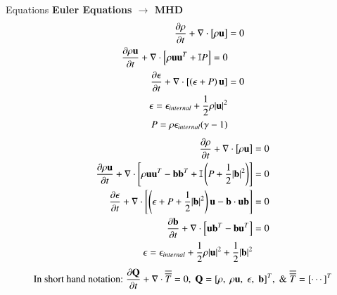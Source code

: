 \begin{frame}[t]{Equations}
  \minipage{\textwidth}
    \textbf{Euler Equations $\rightarrow$ MHD}
      \begin{align*}
        \frac{\partial \rho}{\partial t} + \nabla \cdot \left[\rho \mathbf{u}\right] &= 0 \\
        \frac{\partial \rho \mathbf{u}}{\partial t} + \nabla \cdot \left[\rho \mathbf{u}\mathbf{u}^T + \mathbb{I}P\right] = 0 \\
        \frac{\partial \epsilon}{\partial t} + \nabla \cdot \left[\left(\epsilon + P \right)\mathbf{u}\right] &= 0 \\
        \epsilon = \epsilon_{internal} + \frac{1}{2}\rho|\mathbf{u}|^2 &\\
        P = \rho \epsilon_{internal} (\gamma - 1) &
      \end{align*}
    \endminipage\hfill
      \begin{align*}
        \frac{\partial \rho}{\partial t} + \nabla \cdot \left[\rho \mathbf{u}\right] &= 0 \\
        \frac{\partial \rho \mathbf{u}}{\partial t} + \nabla \cdot \left[\rho \mathbf{u}\mathbf{u}^T - \mathbf{b}\mathbf{b}^T + \mathbb{I}\left(P + \frac{1}{2}|\mathbf{b}|^2\right)\right] &= 0 \\
        \frac{\partial \epsilon}{\partial t} + \nabla \cdot \left[\left(\epsilon + P + \frac{1}{2}|\mathbf{b}|^2\right)\mathbf{u}- \mathbf{b}\cdot\mathbf{u}\mathbf{b}\right] &= 0 \\
        \frac{\partial \mathbf{b}}{\partial t} + \nabla\cdot\left[\mathbf{u}\mathbf{b}^T-\mathbf{b}\mathbf{u}^T\right] &= 0\\
        \epsilon = \epsilon_{internal} + \frac{1}{2}\rho|\mathbf{u}|^2 + \frac{1}{2}|\mathbf{b}|^2 
      \end{align*}
    \endminipage\hfill
  \endminipage
  \begin{equation*}
    \text{In short hand notation:}\;\frac{\partial \mathbf{Q}}{\partial t} + \nabla \cdot \overline{\overline{T}} = 0, \; \mathbf{Q} = [\rho,\;\rho \mathbf{u},\; \epsilon,\;\mathbf{b}]^T, \; \&\; \overline{\overline{T}} = [\cdots]^T
  \end{equation*}
\end{frame}

